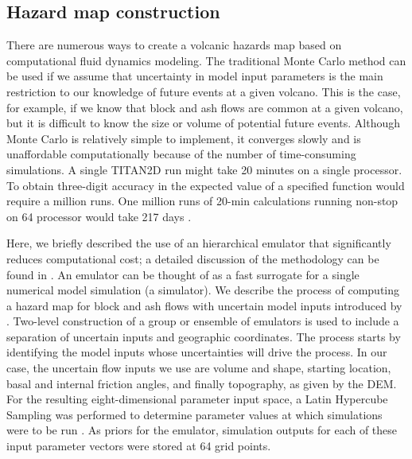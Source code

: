 \documentclass{article}
\begin{document}
\subsection{Hazard map construction}
 
There are numerous ways to create a volcanic hazards map based on
computational fluid dynamics modeling.  The traditional Monte Carlo
method can be used if we assume that uncertainty in model input
parameters is the main restriction to our knowledge of future events
at a given volcano.  This is the case, for example, if we know that
block and ash flows are common at a given volcano, but it is difficult
to know the size or volume of potential future events.  Although Monte
Carlo is relatively simple to implement, it converges slowly and is
unaffordable computationally because of the number of time-consuming
simulations.  A single TITAN2D run might take 20 minutes on a single
processor. To obtain three-digit accuracy in the expected value of a
specified function would require a million runs. One million runs of
20-min calculations running non-stop on 64 processor would take 217
days \citep{Keith}.

Here, we briefly described the use of an hierarchical emulator that
significantly reduces computational cost; a detailed discussion of the
methodology can be found in \citet{dalbeythesis, Keith}. An emulator
can be thought of as a fast surrogate for a single numerical model
simulation (a simulator).  We describe the process of computing a
hazard map for block and ash flows with uncertain model inputs
introduced by \citet{dalbeythesis}.  Two-level construction of a group
or ensemble of emulators is used to include a separation of uncertain
inputs and geographic coordinates.  The process starts by identifying
the model inputs whose uncertainties will drive the process. In our
case, the uncertain flow inputs we use are volume and shape, starting
location, basal and internal friction angles, and finally topography,
as given by the DEM.  For the resulting eight-dimensional parameter
input space, a Latin Hypercube Sampling was performed to determine
parameter values at which simulations were to be run \citep{bayarriusc}. As
priors for the emulator, simulation outputs for each of these input
parameter vectors were stored at 64 grid points.
\end{document}
